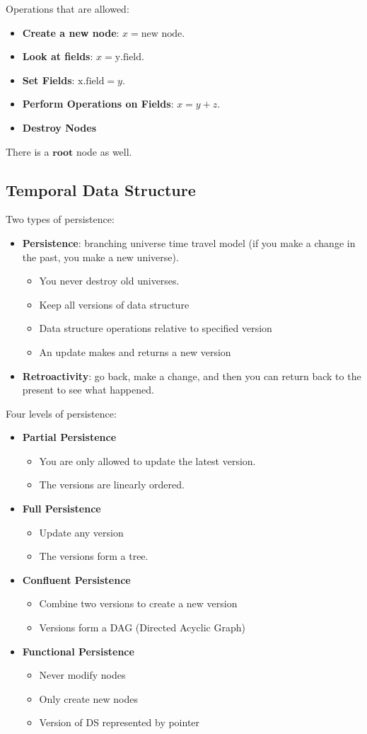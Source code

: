 \documentclass[11pt]{scrartcl}
\begin{document}
Operations that are allowed:
\begin{itemize}
	\item \textbf{Create a new node}: $x = \text{new node}$.
	\item \textbf{Look at fields}: $x = \text{y.field}$.
	\item \textbf{Set Fields}: $\text{x.field} = y$.
	\item \textbf{Perform Operations on Fields}: $x = y + z$.
	\item \textbf{Destroy Nodes}
\end{itemize}
There is a $\textbf{root}$ node as well. 
\subsection{Temporal Data Structure}
Two types of persistence: 
\begin{itemize}
	\item \textbf{Persistence}: branching universe time travel model (if you make a change in the past, you make a new universe). 
		\begin{itemize}
			\item You never destroy old universes.
			\item Keep all versions of data structure
			\item Data structure operations relative to specified version
			\item An update makes and returns  a new version
		\end{itemize}
	\item \textbf{Retroactivity}: go back, make a change, and then you can return back to the present to see what happened.
\end{itemize}
Four levels of persistence:
\begin{itemize}
	\item \textbf{Partial Persistence}
		\begin{itemize}
			\item You are only allowed to update the latest version.
			\item The versions are linearly ordered.
		\end{itemize}
	\item \textbf{Full Persistence}
	\begin{itemize}
		\item Update any version 
		\item The versions form a tree.
	\end{itemize}
\item \textbf{Confluent Persistence}
	\begin{itemize}
		\item Combine two versions to create a new version
		\item Versions form a DAG (Directed Acyclic Graph)
	\end{itemize}
\item \textbf{Functional Persistence}
	\begin{itemize}
		\item Never modify nodes
		\item Only create new nodes
		\item Version of DS represented by pointer
	\end{itemize}
\end{itemize}
\end{document}
